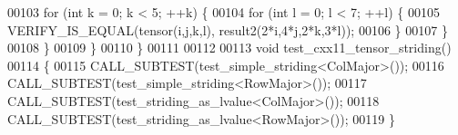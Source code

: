 \begin{DoxyCode}
00103       \textcolor{keywordflow}{for} (\textcolor{keywordtype}{int} k = 0; k < 5; ++k) \{
00104         \textcolor{keywordflow}{for} (\textcolor{keywordtype}{int} l = 0; l < 7; ++l) \{
00105           VERIFY\_IS\_EQUAL(tensor(i,j,k,l), result2(2*i,4*j,2*k,3*l));
00106         \}
00107       \}
00108     \}
00109   \}
00110 \}
00111 
00112 
00113 \textcolor{keywordtype}{void} test\_cxx11\_tensor\_striding()
00114 \{
00115   CALL\_SUBTEST(test\_simple\_striding<ColMajor>());
00116   CALL\_SUBTEST(test\_simple\_striding<RowMajor>());
00117   CALL\_SUBTEST(test\_striding\_as\_lvalue<ColMajor>());
00118   CALL\_SUBTEST(test\_striding\_as\_lvalue<RowMajor>());
00119 \}
\end{DoxyCode}
